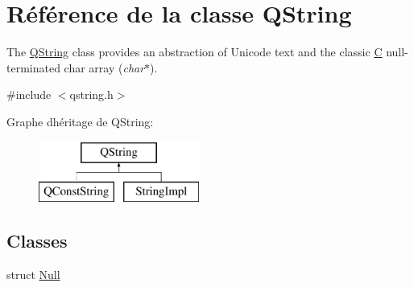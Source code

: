 \hypertarget{class_q_string}{}\section{Référence de la classe Q\+String}
\label{class_q_string}


The \hyperlink{class_q_string}{Q\+String} class provides an abstraction of Unicode text and the classic \hyperlink{class_c}{C} null-\/terminated char array ({\itshape char$\ast$}).  




{\ttfamily \#include $<$qstring.\+h$>$}

Graphe d\textquotesingle{}héritage de Q\+String\+:\begin{figure}[H]
\begin{center}
\leavevmode
\includegraphics[height=2.000000cm]{class_q_string}
\end{center}
\end{figure}
\subsection*{Classes}
\begin{DoxyCompactItemize}
\item 
struct \hyperlink{struct_q_string_1_1_null}{Null}
\end{DoxyCompactItemize}
